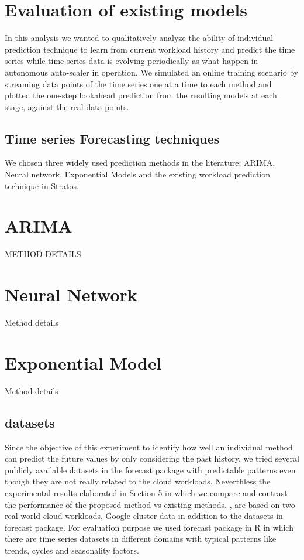 \section{Evaluation of existing models}

In this analysis we wanted to qualitatively analyze the ability of individual prediction technique to learn from current workload history and predict the time series while time series data is evolving periodically as what happen in autonomous auto-scaler in operation. We simulated an online training scenario by streaming data points of the time series one at a time to each method and plotted the one-step lookahead prediction from the resulting models at each stage, against the real data points. 

\subsection{Time series Forecasting techniques}
We chosen three widely used prediction methods in the literature: ARIMA, Neural network, Exponential Models and the existing workload prediction technique in Stratos.

\section{ARIMA}
METHOD DETAILS

\section{Neural Network}
Method details

\section{Exponential Model}
Method details




\subsection{datasets}
Since the objective of this experiment to identify how well an individual method can predict the future values by only considering the past history. we tried several publicly available datasets in the forecast package with predictable patterns even though they are not really related to the cloud workloads. Neverthless the experimental results elaborated in Section 5 in which we  compare and contrast the performance of the proposed method vs existing methods. , are based on two real-world cloud workloads, Google cluster data  in addition to the datasets in forecast package. For evaluation purpose we used forecast package in R \cite{forecastPackage} in which there are time series datasets in different domains with typical patterns like trends, cycles and seasonality factors. 

